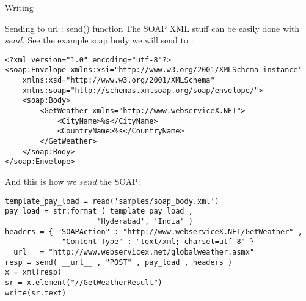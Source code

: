 \begin{section}{Writing}
\begin{subsection}{Sending to url : send() function}
The SOAP XML stuff can be easily done with $send$.
See the example soap body we  will send to :

\begin{lstlisting}[style=xmlStyle]
<?xml version="1.0" encoding="utf-8"?>
<soap:Envelope xmlns:xsi="http://www.w3.org/2001/XMLSchema-instance" 
	xmlns:xsd="http://www.w3.org/2001/XMLSchema" 
	xmlns:soap="http://schemas.xmlsoap.org/soap/envelope/">
    <soap:Body>
        <GetWeather xmlns="http://www.webserviceX.NET">
            <CityName>%s</CityName>
            <CountryName>%s</CountryName>
        </GetWeather>
    </soap:Body>
</soap:Envelope>
\end{lstlisting}

And this is how we $send$ the SOAP: 

\begin{center}\begin{minipage}{\linewidth}
\begin{lstlisting}[style=JexlStyle]
template_pay_load = read('samples/soap_body.xml')
pay_load = str:format ( template_pay_load , 
                     'Hyderabad', 'India' )
headers = { "SOAPAction" : "http://www.webserviceX.NET/GetWeather" , 
             "Content-Type" : "text/xml; charset=utf-8" }
__url__ = "http://www.webservicex.net/globalweather.asmx"
resp = send( __url__ , "POST" , pay_load , headers ) 
x = xml(resp)
sr = x.element("//GetWeatherResult")
write(sr.text)
\end{lstlisting}
\end{minipage}\end{center}

\end{subsection}

\end{section}

